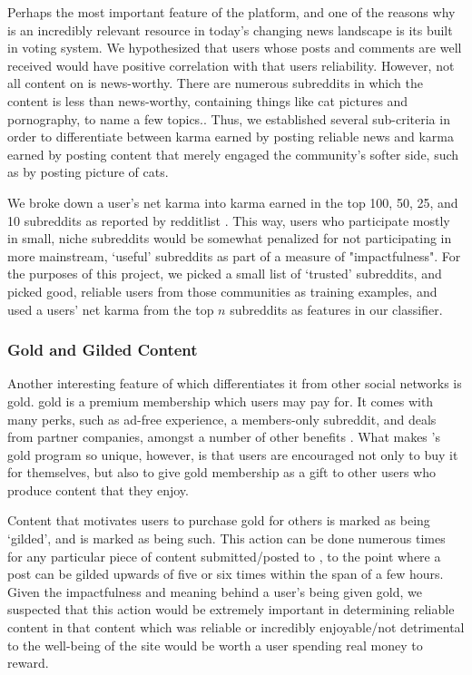 Perhaps the most important feature of the \reddit{} platform, and one of the
reasons why \reddit{} is an incredibly relevant resource in today's changing
news landscape is its built in voting system. We hypothesized that users whose
posts and comments are well received would have positive correlation with that
users reliability. However, not all content on \reddit{} is news-worthy. There
are numerous subreddits in which the content is less than news-worthy,
containing things like cat pictures and pornography, to name a few topics.. Thus,
we established several sub-criteria in order to differentiate between karma
earned by posting reliable news and karma earned by posting content that merely
engaged the community's softer side, such as by posting picture of cats.

We broke down a user's net karma into karma earned in the top 100, 50, 25, and
10 subreddits as reported by redditlist \cite{redditlist}. This way, users who
participate mostly in small, niche subreddits would be somewhat penalized for
not participating in more mainstream, `useful' subreddits as part of a measure
of "impactfulness". For the purposes of this project, we picked a small list of
`trusted' subreddits, and picked good, reliable users from those communities as
training examples, and used a users' net karma from the top $n$ subreddits as
features in our classifier.

\subsubsection{\reddit{} Gold and Gilded Content} %
\label{ssub:reddit_gold_and_gilded_content}

Another interesting feature of \reddit{} which differentiates it from other
social networks is \reddit{} gold. \reddit{} gold is a premium membership which
users may pay for. It comes with many perks, such as ad-free experience, a
members-only subreddit, and deals from partner companies, amongst a number of
other benefits \cite{redditgold}. What makes \reddit{}'s gold program so unique,
however, is that users are encouraged not only to buy it for themselves, but
also to give \reddit{} gold membership as a gift to other users who produce
content that they enjoy.

Content that motivates users to purchase \reddit{} gold for others is marked as
being `gilded', and is marked as being such. This action can be done numerous
times for any particular piece of content submitted/posted to \reddit{}, to the
point where a post can be gilded upwards of five or six times within the span of
a few hours. Given the impactfulness and meaning behind a user's being given
\reddit{} gold, we suspected that this action would be extremely important in
determining reliable content in that content which was reliable or incredibly
enjoyable/not detrimental to the well-being of the site would be worth a user
spending real money to reward.

